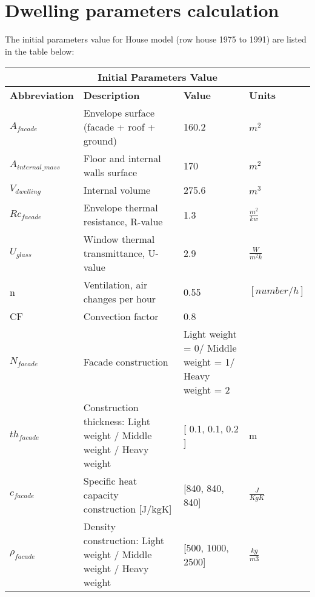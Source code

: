 \appendix
\section{Dwelling parameters calculation}
The initial parameters value for House model (row house 1975 to 1991) are listed in the table below\cite{VOORBEELD}:
    
\begin{tabular}{|p{3cm}||p{7cm}||p{3cm}||p{3cm}|}
 \hline
 \multicolumn{4}{|c|}{Initial Parameters Value} \\
 \hline
\textbf{Abbreviation} & \textbf{Description} & \textbf{Value} & \textbf{Units}\\
 \hline
 
$A_{facade}$ & Envelope surface (facade + roof + ground)   & 160.2 &  $m^2$\\
 \hline

$A_{internal{\_}mass}$ & Floor and internal walls surface    & 170 & $m^2$\\
 \hline

 $V_{dwelling}$ & Internal volume & 275.6 &$m^3$\\
  \hline

 $Rc_{facade}$ & Envelope thermal resistance, R-value & 1.3 &  $\frac{m^2}{kw}$\\
  \hline

 $U_{glass}$& Window thermal transmittance, U-value & 2.9 &$\frac{W}{m^2k}$\\
 \hline

n & Ventilation, air changes per hour  & 0.55 & $[number/h]$\\

\hline

 CF& Convection factor & 0.8 &\\
 \hline
 
 $N_{facade}$ &Facade construction & Light weight = 0/ Middle weight = 1/ Heavy weight = 2 &  \\
 \hline
 
  $th_{facade}$& Construction thickness: Light weight / Middle weight / Heavy weight  & [ 0.1,  0.1, 0.2 ] & m \\
 \hline
  
 $c_{facade}$& Specific heat capacity construction [J/kgK] & [840, 840, 840] &$\frac{J}{KgK}$\\
 \hline
 
 $\rho_{facade}$& Density construction: Light weight / Middle weight / Heavy weight  & [500, 1000, 2500] &$\frac{kg}{m3}$\\
 \hline
 


\end{tabular}
